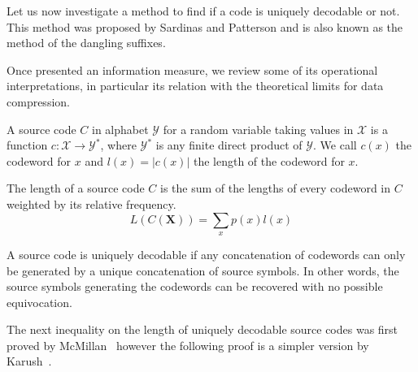 Let us now investigate a method to find if a code is uniquely decodable or not. This method was proposed by Sardinas and Patterson \cite{} and is also known as the method of the dangling suffixes. 

Once presented an information measure, we review some of its operational interpretations, in particular its relation with the theoretical limits for data compression.

A source code $C$ in alphabet $\mathcal{Y}$ for a random variable taking values in $\mathcal{X}$ is a function $c:\mathcal{X}\longrightarrow \mathcal{Y}^*$, where $\mathcal{Y}^*$ is any finite direct product of $\mathcal{Y}$. We call $c(x)$ the codeword for $x$ and $l(x)=|c(x)|$ the length of the codeword for $x$.

The length of a source code $C$ is the sum of the lengths of every codeword in $C$ weighted by its relative frequency.
\begin{equation}
L(C(\mathbf X)) = \sum_{x} p(x) l(x)
\end{equation}

A source code is uniquely decodable if any concatenation of codewords can only be generated by a unique concatenation of source symbols. In other words, the source symbols generating the codewords can be recovered with no possible equivocation. 

The next inequality on the length of uniquely decodable source codes was first proved by McMillan~\cite{McMillan_56} however the following proof is a simpler version by Karush~\cite{Karush_61,Cover_91}.

